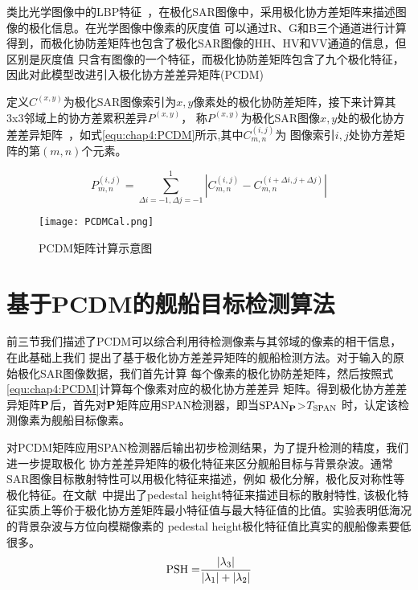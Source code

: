    类比光学图像中的LBP特征~\cite{Lan2017Quaternionic}，在极化SAR图像中，采用极化协方差矩阵来描述图像的极化信息。在光学图像中像素的灰度值
    可以通过R、G和B三个通道进行计算得到，而极化协防差矩阵也包含了极化SAR图像的HH、HV和VV通道的信息，但区别是灰度值
    只含有图像的一个特征，而极化协防差矩阵包含了九个极化特征，因此对此模型改进引入极化协方差差异矩阵(PCDM)

    定义${C^{(x,y)}}$为极化SAR图像索引为$x,y$像素处的极化协防差矩阵，接下来计算其3x3邻域上的协方差累积差异$P^{(x,y)}$，
    称$P^{(x,y)}$为极化SAR图像$x,y$处的极化协方差差异矩阵~\cite{张程2018基于}，如式\ref{equ:chap4:PCDM}所示,其中$C_{m,n}^{(i,j)}$为
    图像索引$i,j$处协方差矩阵的第$(m,n)$个元素。

    \begin{equation}
        \label{equ:chap4:PCDM}
        P_{m,n}^{(i,j)} = \sum\limits_{\Delta i =  - 1,\Delta j =  - 1}^1 {\left| {C_{m,n}^{(i,j)} - C_{m,n}^{(i + \Delta i,j + \Delta j)}} \right|}
    \end{equation}

    \begin{figure}[H] %
      \centering
      \texttt{[image: PCDMCal.png]}
      \caption{PCDM矩阵计算示意图}
      \label{fig:chap4:PCDM}
    \end{figure}   
  \section{基于PCDM的舰船目标检测算法}
      前三节我们描述了PCDM可以综合利用待检测像素与其邻域的像素的相干信息，在此基础上我们
      提出了基于极化协方差差异矩阵的舰船检测方法。对于输入的原始极化SAR图像数据，我们首先计算
      每个像素的极化协防差矩阵，然后按照式\ref{equ:chap4:PCDM}计算每个像素对应的极化协方差差异
      矩阵。得到极化协方差差异矩阵$\bf{P}$后，首先对$\bf{P}$矩阵应用SPAN检测器，即当$\rm{SPAN}_{\bf{P}}$>$T_{\rm{SPAN}}$
      时，认定该检测像素为舰船目标像素。

      对PCDM矩阵应用SPAN检测器后输出初步检测结果，为了提升检测的精度，我们进一步提取极化
      协方差差异矩阵的极化特征来区分舰船目标与背景杂波。通常SAR图像目标散射特性可以用极化特征来描述，例如
      极化分解，极化反对称性等极化特征。在文献~\cite{Durden1990The}中提出了pedestal height特征来描述目标的散射特性,
      该极化特征实质上等价于极化协方差矩阵最小特征值与最大特征值的比值。实验表明低海况的背景杂波与方位向模糊像素的
      pedestal height极化特征值比真实的舰船像素要低很多。
       \begin{equation}
          {\rm{PSH = }}\frac{{\left| {{\lambda _3}} \right|}}{{\left| {{\lambda _1}} \right| + \left| {{\lambda _2}} \right|}}
      \end{equation}

